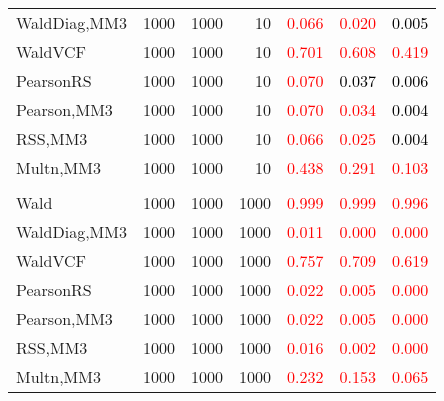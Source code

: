 \documentclass[
]{article}
\begin{document}
\begin{table}[H]
{\begin{tabular}[t]{lrrrrrr}
\hspace{1em}WaldDiag,MM3 & 1000 & 1000 & 10 & \textcolor{red}{0.066} & \textcolor{red}{0.020} & \textcolor{black}{0.005}\\
\hspace{1em}WaldVCF & 1000 & 1000 & 10 & \textcolor{red}{0.701} & \textcolor{red}{0.608} & \textcolor{red}{0.419}\\
\hspace{1em}PearsonRS & 1000 & 1000 & 10 & \textcolor{red}{0.070} & \textcolor{black}{0.037} & \textcolor{black}{0.006}\\
\hspace{1em}Pearson,MM3 & 1000 & 1000 & 10 & \textcolor{red}{0.070} & \textcolor{red}{0.034} & \textcolor{black}{0.004}\\
\hspace{1em}RSS,MM3 & 1000 & 1000 & 10 & \textcolor{red}{0.066} & \textcolor{red}{0.025} & \textcolor{black}{0.004}\\
\hspace{1em}Multn,MM3 & 1000 & 1000 & 10 & \textcolor{red}{0.438} & \textcolor{red}{0.291} & \textcolor{red}{0.103}\\
\addlinespace[0.3em]
\multicolumn{7}{l}{\textbf{1F 15V}}\\
\hspace{1em}Wald & 1000 & 1000 & 1000 & \textcolor{red}{0.999} & \textcolor{red}{0.999} & \textcolor{red}{0.996}\\
\hspace{1em}WaldDiag,MM3 & 1000 & 1000 & 1000 & \textcolor{red}{0.011} & \textcolor{red}{0.000} & \textcolor{red}{0.000}\\
\hspace{1em}WaldVCF & 1000 & 1000 & 1000 & \textcolor{red}{0.757} & \textcolor{red}{0.709} & \textcolor{red}{0.619}\\
\hspace{1em}PearsonRS & 1000 & 1000 & 1000 & \textcolor{red}{0.022} & \textcolor{red}{0.005} & \textcolor{red}{0.000}\\
\hspace{1em}Pearson,MM3 & 1000 & 1000 & 1000 & \textcolor{red}{0.022} & \textcolor{red}{0.005} & \textcolor{red}{0.000}\\
\hspace{1em}RSS,MM3 & 1000 & 1000 & 1000 & \textcolor{red}{0.016} & \textcolor{red}{0.002} & \textcolor{red}{0.000}\\
\hspace{1em}Multn,MM3 & 1000 & 1000 & 1000 & \textcolor{red}{0.232} & \textcolor{red}{0.153} & \textcolor{red}{0.065}\\

\end{tabular}}
\end{table}
\end{document}
